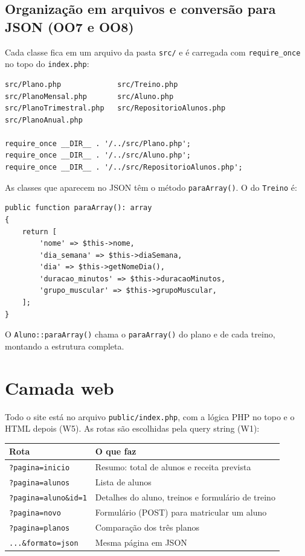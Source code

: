 \documentclass[12pt,a4paper]{article}
\begin{document}
\subsection{Organização em arquivos e conversão para JSON (OO7 e OO8)}

Cada classe fica em um arquivo da pasta \texttt{src/} e é carregada com \texttt{require\_once} no topo do \texttt{index.php}:

\begin{lstlisting}
src/Plano.php             src/Treino.php
src/PlanoMensal.php       src/Aluno.php
src/PlanoTrimestral.php   src/RepositorioAlunos.php
src/PlanoAnual.php

require_once __DIR__ . '/../src/Plano.php';
require_once __DIR__ . '/../src/Aluno.php';
require_once __DIR__ . '/../src/RepositorioAlunos.php';
\end{lstlisting}

As classes que aparecem no JSON têm o método \texttt{paraArray()}. O do \texttt{Treino} é:

\begin{lstlisting}
public function paraArray(): array
{
    return [
        'nome' => $this->nome,
        'dia_semana' => $this->diaSemana,
        'dia' => $this->getNomeDia(),
        'duracao_minutos' => $this->duracaoMinutos,
        'grupo_muscular' => $this->grupoMuscular,
    ];
}
\end{lstlisting}

O \texttt{Aluno::paraArray()} chama o \texttt{paraArray()} do plano e de cada treino, montando a estrutura completa.

\section{Camada web}

Todo o site está no arquivo \texttt{public/index.php}, com a lógica PHP no topo e o HTML depois (W5). As rotas são escolhidas pela query string (W1):

\begin{center}
\begin{tabularx}{\linewidth}{@{}lX@{}}
  \toprule
  \textbf{Rota} & \textbf{O que faz} \\
  \midrule
  \texttt{?pagina=inicio} & Resumo: total de alunos e receita prevista \\
  \texttt{?pagina=alunos} & Lista de alunos \\
  \texttt{?pagina=aluno\&id=1} & Detalhes do aluno, treinos e formulário de treino \\
  \texttt{?pagina=novo} & Formulário (POST) para matricular um aluno \\
  \texttt{?pagina=planos} & Comparação dos três planos \\
  \texttt{...\&formato=json} & Mesma página em JSON \\
  \bottomrule
\end{tabularx}
\end{center}
\end{document}
